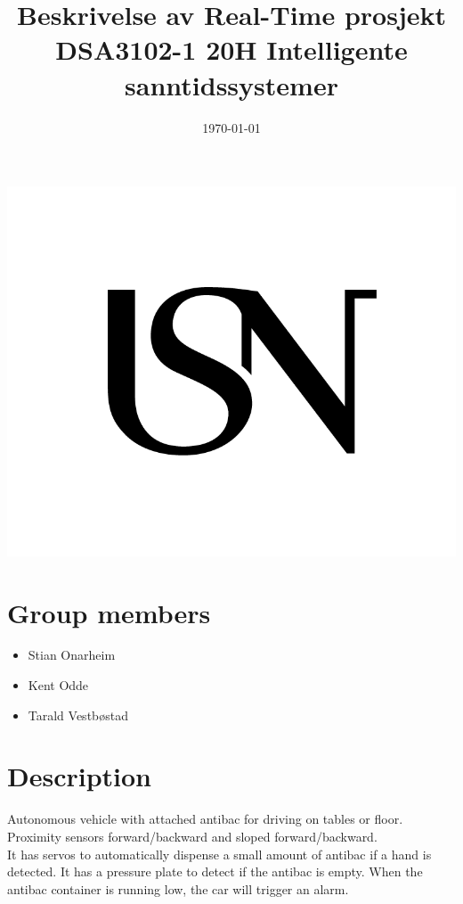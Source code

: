 \documentclass{article}
\title{Beskrivelse av Real-Time prosjekt \large\\
DSA3102-1 20H Intelligente sanntidssystemer}
\date{\today}
\begin{document}
\maketitle
\thispagestyle{empty}
\begin{center}
\includegraphics[width=\linewidth,height=0.2\textheight,keepaspectratio]{img/USN.png}
\end{center}


\newpage
\section{Group members}
	\begin{itemize}
		\item{Stian Onarheim}
		\item{Kent Odde}
		\item{Tarald Vestbøstad}
	\end{itemize}
\newpage
\section{Description}
	Autonomous vehicle with attached antibac for driving on tables or floor.\\
	Proximity sensors forward/backward and sloped forward/backward.\\
	It has servos to automatically dispense a small amount of antibac if a hand is detected. It has a pressure plate to detect if the antibac is empty. When the antibac container is running low, the car will trigger an alarm. 
\end{document}
